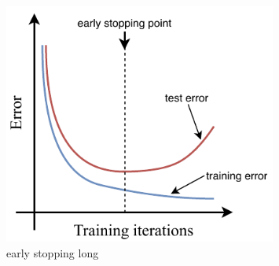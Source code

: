 \begin{figure} %
    \includegraphics[width=0.8\textwidth]{diagrams/7-cvn/early_stopping.pdf}
    \caption[early stopping short]
    {early stopping long}
    \label{fig:early_stopping}
\end{figure}

